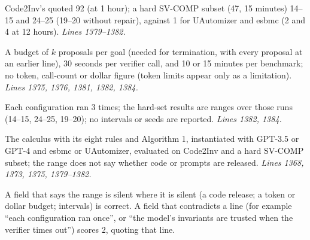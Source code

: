 \documentclass[11pt]{article}
\begin{document}
\begin{description}
  Code2Inv's quoted 92 (at 1 hour); a hard SV-COMP subset (47, 15 minutes)
  14--15 and 24--25 (19--20 without repair), against 1 for UAutomizer and
  esbmc (2 and 4 at 12 hours). \emph{Lines 1379--1382.}
\item[Budget.] A budget of $k$ proposals per goal (needed for termination,
  with every proposal at an earlier line), 30 seconds per verifier call, and
  10 or 15 minutes per benchmark; no token, call-count or dollar figure (token
  limits appear only as a limitation). \emph{Lines 1375, 1376, 1381, 1382,
  1384.}
\item[Variance.] Each configuration ran 3 times; the hard-set results are
  ranges over those runs (14--15, 24--25, 19--20); no intervals or seeds are
  reported. \emph{Lines 1382, 1384.}
\item[Artifact.] The calculus with its eight rules and Algorithm 1,
  instantiated with GPT-3.5 or GPT-4 and esbmc or UAutomizer, evaluated on
  Code2Inv and a hard SV-COMP subset; the range does not say whether code or
  prompts are released. \emph{Lines 1368, 1373, 1375, 1379--1382.}
\end{description}
A field that says the range is silent where it is silent (a code release; a
token or dollar budget; intervals) is correct. A field that contradicts a line
(for example ``each configuration ran once'', or ``the model's invariants are
trusted when the verifier times out'') scores 2, quoting that line.
\end{document}
